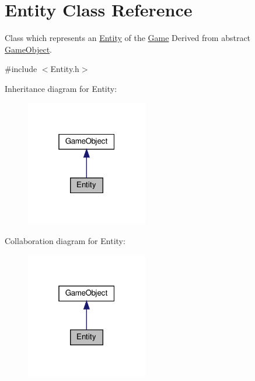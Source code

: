 \hypertarget{classEntity}{}\section{Entity Class Reference}
\label{classEntity}


Class which represents an \hyperlink{classEntity}{Entity} of the \hyperlink{classGame}{Game} Derived from abstract \hyperlink{classGameObject}{Game\+Object}.  




{\ttfamily \#include $<$Entity.\+h$>$}



Inheritance diagram for Entity\+:
\nopagebreak
\begin{figure}[H]
\begin{center}
\leavevmode
\includegraphics[width=151pt]{classEntity__inherit__graph}
\end{center}
\end{figure}


Collaboration diagram for Entity\+:
\nopagebreak
\begin{figure}[H]
\begin{center}
\leavevmode
\includegraphics[width=151pt]{classEntity__coll__graph}
\end{center}
\end{figure}

